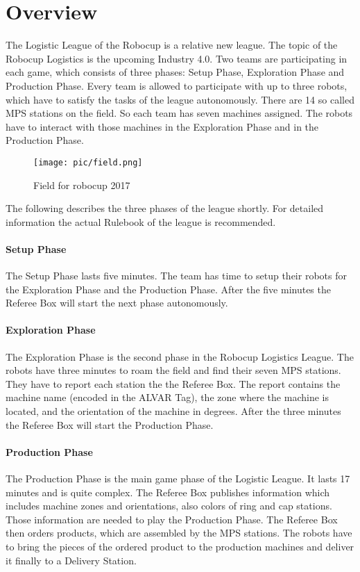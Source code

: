 \section{Overview}

The Logistic League of the Robocup is a relative new league. The topic of the Robocup Logistics is the upcoming Industry 4.0. Two teams are participating in each game, which consists of three phases: Setup Phase, Exploration Phase and Production Phase. Every team is allowed to participate with up to three robots, which have to satisfy the tasks of the league autonomously. There are 14 so called MPS stations on the field. So each team has seven machines assigned. The robots have to interact with those machines in the Exploration Phase and in the Production Phase.

\begin{figure}%
\centering
\texttt{[image: pic/field.png]}
\caption{Field for robocup 2017}
\label{fig:frog}
\end{figure}

The following describes the three phases of the league shortly. For detailed information the actual Rulebook  \cite{RC17} of the league is recommended.

\paragraph{Setup Phase}
The Setup Phase lasts five minutes. The team has time to setup their robots for the Exploration Phase and the Production Phase. After the five minutes the Referee Box will start the next phase autonomously.

\paragraph{Exploration Phase}
The Exploration Phase is the second phase in the Robocup Logistics League. The robots have three minutes to roam the field and find their seven MPS stations. They have to report each station the the Referee Box. The report contains the machine name (encoded in the ALVAR Tag), the zone where the machine is located, and the orientation of the machine in degrees. After the three minutes the Referee Box will start the Production Phase.

\paragraph{Production Phase}
The Production Phase is the main game phase of the Logistic League. It lasts 17 minutes and is quite complex. The Referee Box publishes information which includes machine zones and orientations, also colors of ring and cap stations. Those information are needed to play the Production Phase. The Referee Box then orders products, which are assembled by the MPS stations. The robots have to bring the pieces of the ordered product to the production machines and deliver it finally to a Delivery Station. 



